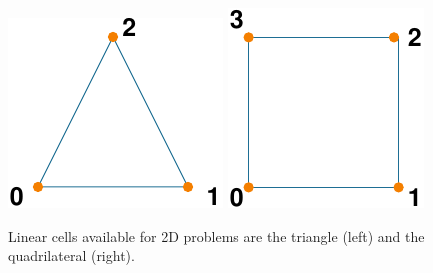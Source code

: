 \begin{figure}[htbp]
  \includegraphics{runpylith/figs/tri3}\hspace*{0.5in}%
  \includegraphics{runpylith/figs/quad4}
  \caption{Linear cells available for 2D problems are the triangle
    (left) and the quadrilateral (right).}
  \label{fig:2D:cells}
\end{figure}

